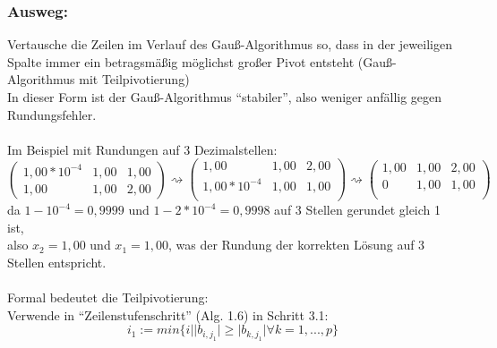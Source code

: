 \documentclass{scrbook}
\begin{document}
\subsubsection*{Ausweg:}
Vertausche die Zeilen im Verlauf des Gauß-Algorithmus so, dass in der jeweiligen Spalte immer ein betragsmäßig möglichst großer Pivot entsteht (Gauß-Algorithmus mit Teilpivotierung)\\
In dieser Form ist der Gauß-Algorithmus "`stabiler"', also weniger anfällig gegen Rundungsfehler.
\\\\
Im Beispiel mit Rundungen auf 3 Dezimalstellen:
\[
\left(
\begin{array}{cc|c}
1,00*10^{-4}&1,00&1,00\\
1,00&1,00&2,00
\end{array}
\right)
\rightsquigarrow
\left(
\begin{array}{cc|c}
1,00&1,00&2,00\\
1,00*10^{-4}&1,00&1,00\\
\end{array}
\right)
\rightsquigarrow
\left(
\begin{array}{cc|c}
1,00&1,00&2,00\\
0&1,00&1,00\\
\end{array}
\right)
\]
da \(1-10^{-4} = 0,9999 \text{ und } 1-2*10^{-4} =0,9998\) auf 3 Stellen gerundet gleich 1 ist,\\
also \(x_2=1,00\) und \(x_1=1,00\), was der Rundung der korrekten Lösung auf 3 Stellen entspricht.\\
\\
Formal bedeutet die Teilpivotierung:\\
Verwende in "`Zeilenstufenschritt"' (Alg. 1.6) in Schritt 3.1:
\[
i_1 := min\{i||b_{i,j_1}|\geq | b_{k,j_1}| \forall k=1,...,p\}
\]
\end{document}
